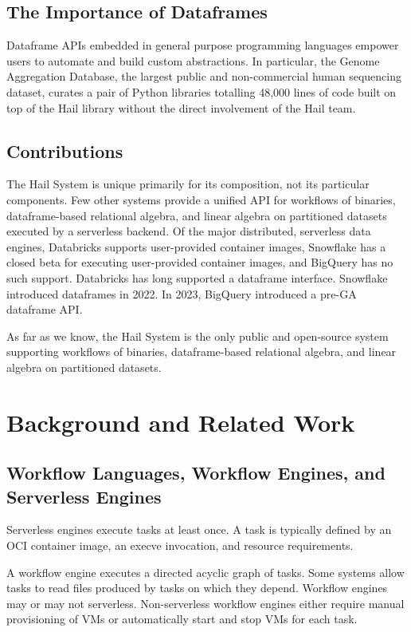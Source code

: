 \documentclass[sigconf, nonacm]{acmart}
\begin{document}
\subsection{The Importance of Dataframes}

Dataframe APIs embedded in general purpose programming languages empower users to automate and build
custom abstractions. In particular, the Genome Aggregation Database, the largest public and
non-commercial human sequencing dataset, curates a pair of Python libraries totalling 48,000 lines
of code built on top of the Hail library without the direct involvement of the Hail team.

\subsection{Contributions}

The Hail System is unique primarily for its composition, not its particular components. Few other
systems provide a unified API for workflows of binaries, dataframe-based relational algebra, and
linear algebra on partitioned datasets executed by a serverless backend. Of the major distributed,
serverless data engines, Databricks supports user-provided container images, Snowflake has a closed
beta for executing user-provided container images, and BigQuery has no such support. Databricks has
long supported a dataframe interface. Snowflake introduced dataframes in 2022. In 2023, BigQuery
introduced a pre-GA dataframe API.

As far as we know, the Hail System is the only public and open-source system supporting workflows of
binaries, dataframe-based relational algebra, and linear algebra on partitioned datasets.

\section{Background and Related Work}

\subsection{Workflow Languages, Workflow Engines, and Serverless Engines}

Serverless engines execute tasks at least once. A task is typically defined by an OCI container
image, an execve invocation, and resource requirements.

A workflow engine executes a directed acyclic graph of tasks. Some systems allow tasks to read files
produced by tasks on which they depend. Workflow engines may or may not serverless. Non-serverless
workflow engines either require manual provisioning of VMs or automatically start and stop VMs for
each task.
\end{document}
